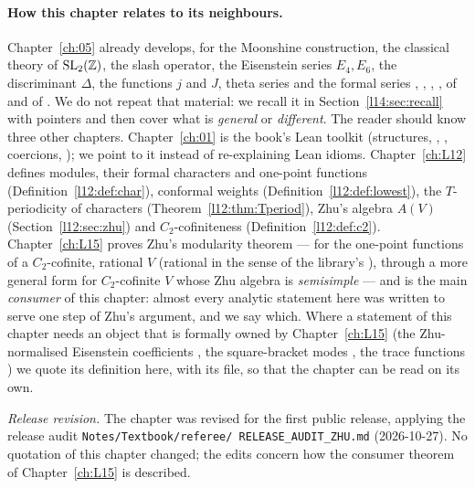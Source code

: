 \paragraph{How this chapter relates to its neighbours.} Chapter~\ref{ch:05} already develops, for the Moonshine
construction, the classical theory of $\mathrm{SL}_2(\mathbb{Z})$, the slash operator, the Eisenstein series $E_4,E_6$, the
discriminant $\Delta$, the functions $j$ and $J$, theta series and the formal series ,
, , ,  of  and
 of . We do not repeat that material: we
recall it in Section~\ref{l14:sec:recall} with pointers and then cover what is \emph{general} or \emph{different}. The
reader should know three other chapters. Chapter~\ref{ch:01} is the book's Lean toolkit (structures, ,
, coercions, ); we point to it instead of re-explaining Lean idioms.
Chapter~\ref{ch:L12} defines modules, their formal characters  and one-point functions 
(Definition~\ref{l12:def:char}), conformal weights (Definition~\ref{l12:def:lowest}), the $T$-periodicity of characters
(Theorem~\ref{l12:thm:Tperiod}), Zhu's algebra $A(V)$ (Section~\ref{l12:sec:zhu}) and $C_2$-cofiniteness
(Definition~\ref{l12:def:c2}). Chapter~\ref{ch:L15} proves Zhu's modularity theorem --- for the one-point functions of a
$C_2$-cofinite, rational $V$ (rational in the sense of the library's ), through a more general form
for $C_2$-cofinite $V$ whose Zhu algebra is \emph{semisimple} --- and is the main
\emph{consumer} of this chapter: almost every analytic statement here was written to serve one step of Zhu's argument, and we say which.
Where a statement of this chapter needs an object that is formally owned by Chapter~\ref{ch:L15} (the Zhu-normalised
Eisenstein coefficients , the square-bracket modes , the trace functions ) we quote its
definition here, with its file, so that the chapter can be read on its own.

\emph{Release revision.} The chapter was revised for the first public release, applying the release audit \texttt{Notes/\allowbreak Textbook/\allowbreak referee/\allowbreak
RELEASE\_AUDIT\_ZHU.md} (2026-10-27). No quotation of this chapter changed; the edits concern how the consumer theorem of
Chapter~\ref{ch:L15} is described.

